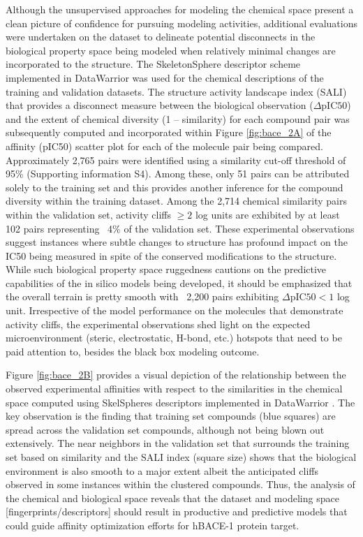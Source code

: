 Although the unsupervised approaches for modeling the chemical space present a clean picture of confidence for pursuing modeling activities, additional evaluations were undertaken on the dataset to delineate potential disconnects in the biological property space being modeled when relatively minimal changes are incorporated to the structure.  The SkeletonSphere descriptor scheme implemented in DataWarrior \cite{sander2015datawarrior} was used for the chemical descriptions of the training and validation datasets. The structure activity landscape index (SALI) \cite{guha2008structure} that provides a disconnect measure between the biological observation ($\Delta \text{pIC50}$) and the extent of chemical diversity (1 – similarity) for each compound pair was subsequently computed and incorporated within Figure \ref{fig:bace_2A} of the affinity (pIC50) scatter plot for each of the molecule pair being compared.  Approximately 2,765 pairs were identified using a similarity cut-off threshold of 95\% (Supporting information S4).  Among these, only 51 pairs can be attributed solely to the training set and this provides another inference for the compound diversity within the training dataset.  Among the 2,714 chemical similarity pairs within the validation set, activity cliffs $\geq 2$ log units are exhibited by at least 102 pairs representing ~4\% of the validation set.  These experimental observations suggest instances where subtle changes to structure has profound impact on the IC50 being measured in spite of the conserved modifications to the structure.  While such biological property space ruggedness cautions on the predictive capabilities of the in silico models being developed, it should be emphasized that the overall terrain is pretty smooth with ~2,200 pairs exhibiting $\Delta \text{pIC50} < 1$ log unit.  Irrespective of the model performance on the molecules that demonstrate activity cliffs, the experimental observations shed light on the expected microenvironment (steric, electrostatic, H-bond, etc.) hotspots that need to be paid attention to, besides the black box modeling outcome.  


Figure \ref{fig:bace_2B} provides a visual depiction of the relationship between the observed experimental affinities with respect to the similarities in the chemical space computed using SkelSpheres descriptors implemented in DataWarrior \cite{sander2015datawarrior}.  The key observation is the finding that training set compounds (blue squares) are spread across the validation set compounds, although not being blown out extensively.  The near neighbors in the validation set that surrounds the training set based on similarity and the SALI index (square size) shows that the biological environment is also smooth to a major extent albeit the anticipated cliffs observed in some instances within the clustered compounds.  
Thus, the analysis of the chemical and biological space reveals that the dataset and modeling space [fingerprints/descriptors] should result in productive and predictive models that could guide affinity optimization efforts for hBACE-1 protein target.

